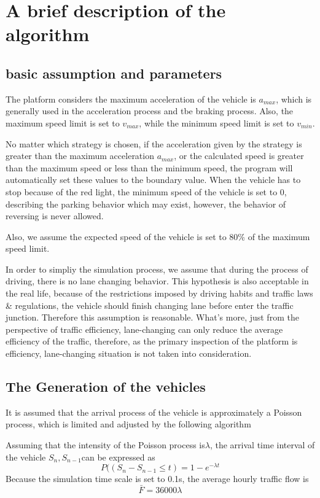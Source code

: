 \documentclass[a4paper]{paper}
\begin{document}
\section{A brief description of the algorithm}
\subsection{basic assumption and parameters}
The platform considers the maximum acceleration of the vehicle is $a_{max}$, which is generally used in the acceleration process and tbe braking process. Also, the maximum speed limit is set to $v_{max}$, while the minimum speed limit is set to $v_{min}$.

No matter which strategy is chosen, if the acceleration given by the strategy is greater than the maximum acceleration $a_{max}$, or the calculated speed is greater than the maximum speed or less than the minimum speed, the program will automatically set these values to the boundary value. When the vehicle has to stop because of the red light, the minimum speed of the vehicle is set to 0, describing the parking behavior which may exist, however, the behavior of reversing is never allowed.

Also, we assume the expected speed of the vehicle is set to 80\% of the maximum speed limit.

In order to simpliy the simulation process, we assume that during the process of driving, there is no lane changing behavior. This hypothesis is also acceptable in the real life, because of the restrictions imposed by driving habits and traffic laws \& regulations, the vehicle should finish changing lane before enter the traffic junction. Therefore this assumption is reasonable. What's more, just from the perspective of traffic efficiency, lane-changing can only reduce the average efficiency of the traffic, therefore, as the primary inspection of the platform is efficiency, lane-changing situation is not taken into consideration.
\subsection{The Generation of the vehicles}
It is assumed that the arrival process of the vehicle is approximately a Poisson process, which is limited and adjusted by the following algorithm

Assuming that the intensity of the Poisson process is$\lambda$, the arrival time interval of the vehicle $S_n,S_{n-1}$can be expressed as 
$$P((S_n-S_{n-1}\le t) = 1 - e^{-\lambda t}$$
Because the simulation time scale is set to 0.1s, the average hourly traffic flow is $$\bar{F}=36000\lambda$$
\end{document}

